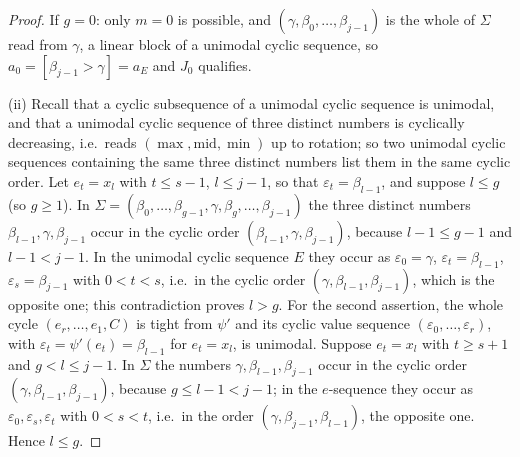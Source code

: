 \documentclass{amsart}
\theoremstyle{definition}
\theoremstyle{remark}
\numberwithin{equation}{section}
\begin{document}
\begin{proof}
If $g=0$: only $m=0$ is possible, and $(\gamma,\beta_0,\ldots,\beta_{j-1})$ is the whole of $\Sigma$ read from $\gamma$, a linear block of a unimodal cyclic sequence, so $a_0=[\beta_{j-1}>\gamma]=a_E$ and $J_0$ qualifies.

(ii) Recall that a cyclic subsequence of a unimodal cyclic sequence is unimodal, and that a unimodal cyclic sequence of three distinct numbers is cyclically decreasing, i.e.\ reads $(\max,\mathrm{mid},\min)$ up to rotation; so two unimodal cyclic sequences containing the same three distinct numbers list them in the same cyclic order. Let $e_t=x_l$ with $t\leq s-1$, $l\leq j-1$, so that $\varepsilon_t=\beta_{l-1}$, and suppose $l\leq g$ (so $g\geq1$). In $\Sigma=(\beta_0,\ldots,\beta_{g-1},\gamma,\beta_g,\ldots,\beta_{j-1})$ the three distinct numbers $\beta_{l-1},\gamma,\beta_{j-1}$ occur in the cyclic order $(\beta_{l-1},\gamma,\beta_{j-1})$, because $l-1\leq g-1$ and $l-1<j-1$. In the unimodal cyclic sequence $E$ they occur as $\varepsilon_0=\gamma$, $\varepsilon_t=\beta_{l-1}$, $\varepsilon_s=\beta_{j-1}$ with $0<t<s$, i.e.\ in the cyclic order $(\gamma,\beta_{l-1},\beta_{j-1})$, which is the opposite one; this contradiction proves $l>g$. For the second assertion, the whole cycle $(e_r,\ldots,e_1,C)$ is tight from $\psi'$ and its cyclic value sequence $(\varepsilon_0,\ldots,\varepsilon_r)$, with $\varepsilon_t=\psi'(e_t)=\beta_{l-1}$ for $e_t=x_l$, is unimodal. Suppose $e_t=x_l$ with $t\geq s+1$ and $g<l\leq j-1$. In $\Sigma$ the numbers $\gamma,\beta_{l-1},\beta_{j-1}$ occur in the cyclic order $(\gamma,\beta_{l-1},\beta_{j-1})$, because $g\leq l-1<j-1$; in the $e$-sequence they occur as $\varepsilon_0,\varepsilon_s,\varepsilon_t$ with $0<s<t$, i.e.\ in the order $(\gamma,\beta_{j-1},\beta_{l-1})$, the opposite one. Hence $l\leq g$.
\end{proof}
\end{document}
